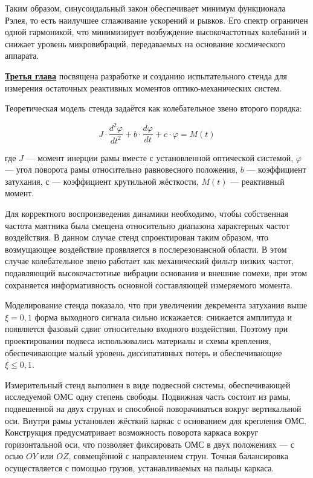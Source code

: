Таким образом, синусоидальный закон обеспечивает минимум функционала Рэлея, то есть наилучшее сглаживание ускорений и рывков. 
Его спектр ограничен одной гармоникой, что минимизирует возбуждение высокочастотных колебаний и снижает уровень микровибраций, передаваемых на основание космического аппарата.





\underline{\textbf{Третья глава}} посвящена разработке и созданию испытательного стенда для измерения остаточных реактивных моментов оптико-механических систем.

Теоретическая модель стенда задаётся как колебательное звено второго порядка:

\begin{equation}
	\label{eq:stadeq}
	J\cdot \frac{d^2\varphi}{dt^2}+b \cdot \frac{d\varphi}{dt}+ c \cdot \varphi = M(t)
\end{equation}

где \(J\) --- момент инерции рамы вместе с установленной оптической системой, \(\varphi\) --- угол поворота рамы относительно равновесного положения, \(b\) --- коэффициент затухания, \(с\) --- коэффициент крутильной жёсткости, \(M(t)\) --- реактивный момент.

Для корректного воспроизведения динамики необходимо, чтобы собственная частота маятника была смещена относительно диапазона характерных частот воздействия. В данном случае стенд спроектирован таким образом, что возмущающее воздействие проявляется в послерезонансной области. В этом случае колебательное звено работает как механический фильтр низких частот, подавляющий высокочастотные вибрации основания и внешние помехи, при этом сохраняется информативность основной составляющей измеряемого момента.

Моделирование стенда показало, что при увеличении декремента затухания выше $\xi=0,1$ форма выходного сигнала сильно искажается: снижается амплитуда и появляется фазовый сдвиг относительно входного воздействия. Поэтому при проектировании подвеса использовались материалы и схемы крепления, обеспечивающие малый уровень диссипативных потерь и обеспечивающие $\xi \leq 0,1$.



Измерительный стенд выполнен в виде подвесной системы, обеспечивающей исследуемой ОМС одну степень свободы. Подвижная часть состоит из рамы, подвешенной на двух струнах и способной поворачиваться вокруг вертикальной оси. Внутри рамы установлен жёсткий каркас с основанием для крепления ОМС. Конструкция предусматривает возможность поворота каркаса вокруг горизонтальной оси, что позволяет фиксировать ОМС в двух положениях — с осью $OY$ или $OZ$, совмещённой с направлением струн. Точная балансировка осуществляется с помощью грузов, устанавливаемых на пальцы каркаса.

